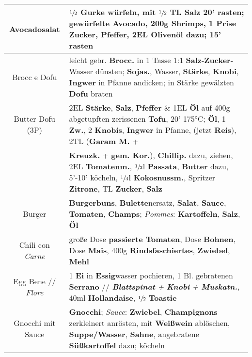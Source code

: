 \documentclass{article}
\begin{document}
\small
	\begin{tabular}{c|l}
        Avocadosalat & $\sfrac{1}{2}$ \textbf{Gurke} würfeln, mit $\sfrac{1}{2}$ TL \textbf{Salz} 20' rasten; gewürfelte \textbf{Avocado}, 200g \textbf{Shrimps}, 1 Prise \textbf{Zucker}, \textbf{Pfeffer}, 2EL \textbf{Olivenöl} dazu; 15' rasten\\\hline

        Brocc e Dofu & leicht gebr. \textbf{Brocc.} in 1 Tasse 1:1 \textbf{Salz}-\textbf{Zucker}-Wasser dünsten; \textbf{Sojas.}, Wasser, \textbf{Stärke}, \textbf{Knobi}, \textbf{Ingwer} in Pfanne andicken; in Stärke gewälzten \textbf{Dofu} braten \\\hline

        Butter Dofu {\scriptsize(3P)}&  2EL \textbf{Stärke}, \textbf{Salz}, \textbf{Pfeffer} \& 1EL \textbf{Öl} auf 400g abgetupften zerissenen \textbf{Tofu}, 20' 175°C; \textbf{Öl}, 1 \textbf{Zw.}, 2 \textbf{Knobis}, \textbf{Ingwer} in Pfanne, (jetzt \textbf{Reis}), 2TL (\textbf{Garam M.} + \\&
        \textbf{Kreuzk.} + \textbf{gem. Kor.}), \textbf{Chillip.} dazu, ziehen, 2EL \textbf{Tomatenm.}, $\sfrac{1}{2}$l \textbf{Passata}, \textbf{Butter} dazu, 5'-10' köcheln, $\sfrac{1}{4}$l \textbf{Kokosnussm.}, Spritzer \textbf{Zitrone}, TL \textbf{Zucker}, \textbf{Salz}\\\hline

        Burger & \textbf{Burgerbuns}, \textbf{Bulette}nersatz, \textbf{Salat}, \textbf{Sauce}, \textbf{Tomaten}, \textbf{Champs}; \textit{Pommes}: \textbf{Kartoffeln}, \textbf{Salz}, \textbf{Öl}\\\hline

        Chili con \textit{Carne} & große Dose \textbf{passierte Tomaten}, Dose \textbf{Bohnen}, Dose \textbf{Mais}, 400g \textbf{Rindsfaschiertes}, \textbf{Zwiebel}, \textbf{Mehl} \\\hline
		
        Egg Bene // \textit{Flore} & 1 \textbf{Ei} in \textbf{Essig}wasser pochieren, 1 Bl. gebratenen \textbf{Serrano} // \textit{\textbf{Blattspinat} + \textbf{Knobi} + \textbf{Muskatn.}}, 40ml \textbf{Hollandaise}, $\sfrac{1}{2}$ \textbf{Toastie}\\\hline

		Gnocchi mit Sauce & \textbf{Gnocchi}; \textit{Sauce}: \textbf{Zwiebel}, \textbf{Champignons} zerkleinert anrösten, mit \textbf{Weißwein} ablöschen, \textbf{Suppe/Wasser}, \textbf{Sahne}, angebratene \textbf{Süßkartoffel} dazu; köcheln\\\hline
		

\end{tabular}
\end{document}
